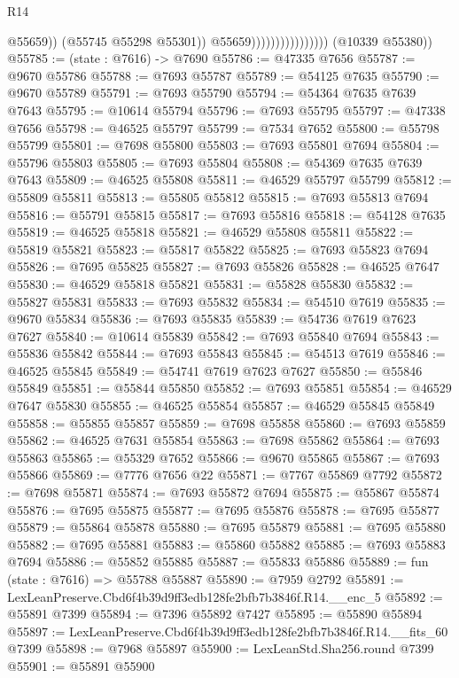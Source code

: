 \begin{lexlean}{R14}
\begin{coremodule}
                                            @55659))
                                        (@55745 @55298 @55301))
                                      @55659))))))))))))))))
      (@10339 @55380))
@55785 := (state : @7616) -> @7690
@55786 := @47335 @7656
@55787 := @9670 @55786
@55788 := @7693 @55787
@55789 := @54125 @7635
@55790 := @9670 @55789
@55791 := @7693 @55790
@55794 := @54364 @7635 @7639 @7643
@55795 := @10614 @55794
@55796 := @7693 @55795
@55797 := @47338 @7656
@55798 := @46525 @55797
@55799 := @7534 @7652
@55800 := @55798 @55799
@55801 := @7698 @55800
@55803 := @7693 @55801 @7694
@55804 := @55796 @55803
@55805 := @7693 @55804
@55808 := @54369 @7635 @7639 @7643
@55809 := @46525 @55808
@55811 := @46529 @55797 @55799
@55812 := @55809 @55811
@55813 := @55805 @55812
@55815 := @7693 @55813 @7694
@55816 := @55791 @55815
@55817 := @7693 @55816
@55818 := @54128 @7635
@55819 := @46525 @55818
@55821 := @46529 @55808 @55811
@55822 := @55819 @55821
@55823 := @55817 @55822
@55825 := @7693 @55823 @7694
@55826 := @7695 @55825
@55827 := @7693 @55826
@55828 := @46525 @7647
@55830 := @46529 @55818 @55821
@55831 := @55828 @55830
@55832 := @55827 @55831
@55833 := @7693 @55832
@55834 := @54510 @7619
@55835 := @9670 @55834
@55836 := @7693 @55835
@55839 := @54736 @7619 @7623 @7627
@55840 := @10614 @55839
@55842 := @7693 @55840 @7694
@55843 := @55836 @55842
@55844 := @7693 @55843
@55845 := @54513 @7619
@55846 := @46525 @55845
@55849 := @54741 @7619 @7623 @7627
@55850 := @55846 @55849
@55851 := @55844 @55850
@55852 := @7693 @55851
@55854 := @46529 @7647 @55830
@55855 := @46525 @55854
@55857 := @46529 @55845 @55849
@55858 := @55855 @55857
@55859 := @7698 @55858
@55860 := @7693 @55859
@55862 := @46525 @7631 @55854
@55863 := @7698 @55862
@55864 := @7693 @55863
@55865 := @55329 @7652
@55866 := @9670 @55865
@55867 := @7693 @55866
@55869 := @7776 @7656 @22
@55871 := @7767 @55869 @7792
@55872 := @7698 @55871
@55874 := @7693 @55872 @7694
@55875 := @55867 @55874
@55876 := @7695 @55875
@55877 := @7695 @55876
@55878 := @7695 @55877
@55879 := @55864 @55878
@55880 := @7695 @55879
@55881 := @7695 @55880
@55882 := @7695 @55881
@55883 := @55860 @55882
@55885 := @7693 @55883 @7694
@55886 := @55852 @55885
@55887 := @55833 @55886
@55889 := fun (state : @7616) => @55788 @55887
@55890 := @7959 @2792
@55891 := LexLeanPreserve.Cbd6f4b39d9ff3edb128fe2bfb7b3846f.R14.__enc_5
@55892 := @55891 @7399
@55894 := @7396 @55892 @7427
@55895 := @55890 @55894
@55897 := LexLeanPreserve.Cbd6f4b39d9ff3edb128fe2bfb7b3846f.R14.__fits_60 @7399
@55898 := @7968 @55897
@55900 := LexLeanStd.Sha256.round @7399
@55901 := @55891 @55900

\end{coremodule}
\end{lexlean}
